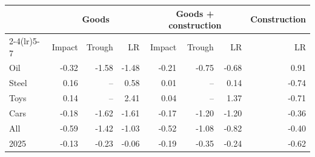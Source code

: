 \begin{tabular}{lrrrrrrr}
\toprule
 & \multicolumn{3}{c}{Goods} & \multicolumn{3}{c}{Goods + construction} & Construction \\
\cmidrule(lr){2-4}\cmidrule(lr){5-7}
 & Impact & Trough & LR & Impact & Trough & LR & LR \\
\midrule
Oil & -0.32 & -1.58 & -1.48 & -0.21 & -0.75 & -0.68 & 0.91 \\
Steel & 0.16 & -- & 0.58 & 0.01 & -- & 0.14 & -0.74 \\
Toys & 0.14 & -- & 2.41 & 0.04 & -- & 1.37 & -0.71 \\
Cars & -0.18 & -1.62 & -1.61 & -0.17 & -1.20 & -1.20 & -0.36 \\
All & -0.59 & -1.42 & -1.03 & -0.52 & -1.08 & -0.82 & -0.40 \\
2025 & -0.13 & -0.23 & -0.06 & -0.19 & -0.35 & -0.24 & -0.62 \\
\bottomrule
\end{tabular}
